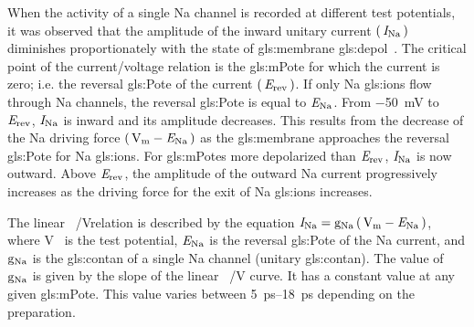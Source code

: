 \documentclass[class={myRUCProject}, crop=false]{standalone}
\begin{document}
When the activity of a single \gls{Na} channel is recorded at different test potentials, 
it was observed that the amplitude of the inward unitary current \(\left(\,\mathit{I}_\mathrm{Na}\,\right)\) diminishes proportionately with the state of \gls{gls:membrane} \gls{gls:depol}~\cite{Hammond2015ch4}. 
The critical point of the current/voltage relation is the \gls{gls:mPote} for which the current is zero; i.e. the reversal \gls{gls:Pote} of the current \(\left(\,\mathit{E}_\mathrm{rev}\,\right)\). 
If only \gls{Na} \glspl{gls:ion} flow through \gls{Na} channels, the reversal \gls{gls:Pote} is equal to \(\mathit{E}_\mathrm{Na}\). 
From \qty{-50}{\mV} to \(\mathit{E}_\mathrm{rev}\), \(\mathit{I}_\mathrm{Na}\) is inward and its amplitude decreases. This results from the decrease of the \gls{Na} driving force \(\br{\unit{\V\membrane}-\equi\sodium}\) as the \gls{gls:membrane} approaches the reversal \gls{gls:Pote} for \gls{Na} \glspl{gls:ion}. For \glspl{gls:mPote} more depolarized than \(\mathit{E}_\mathrm{rev}\), \(\mathit{I}_\mathrm{Na}\) is now outward. Above \(\mathit{E}_\mathrm{rev}\), the amplitude of the outward \gls{Na} current progressively increases as the driving force for the exit of \gls{Na} \glspl{gls:ion} increases. 

The linear \unit[per-mode = symbol]{\curr\sodium\per\V}relation is described by the equation \(\curr\sodium = \con\sodium \br{\unit{\V\membrane}-\equi\sodium}\), where \unit{\V\membrane} is the test potential, \(\mathit{E}_\mathrm{Na}\) is the reversal \gls{gls:Pote} of the \gls{Na} current, and \(\mathrm{g}_\mathrm{Na}\) is the \gls{gls:contan} of a single \gls{Na} channel (unitary \gls{gls:contan}). The value of \(\mathrm{g}_\mathrm{Na}\) is given by the slope of the linear \unit[per-mode = symbol]{\curr\sodium\per\V} curve. It has a constant value at any given \gls{gls:mPote}. This value varies between \qtyrange{5}{18}{\pico\second} depending on the preparation.
\end{document}
